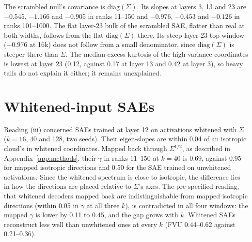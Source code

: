 \documentclass[10pt,twocolumn]{article}
\newcommand{\Sig}{\Sigma}
\begin{document}
The scrambled null's covariance is $\mathrm{diag}(\Sig)$. Its slopes at layers 3, 13 and 23 are $-0.545$, $-1.166$ and $-0.905$ in ranks 11--150 and $-0.976$, $-0.453$ and $-0.126$ in ranks 101--1000. The flat layer-23 bulk of the scrambled SAE, flatter than real at both widths, follows from the flat $\mathrm{diag}(\Sig)$ there. Its steep layer-23 top window ($-0.976$ at 16k) does not follow from a small denominator, since $\mathrm{diag}(\Sig)$ is steeper there than $\Sig$. The median excess kurtosis of the high-variance coordinates is lowest at layer 23 (0.12, against 0.17 at layer 13 and 0.42 at layer 3), so heavy tails do not explain it either; it remains unexplained.

\section{Whitened-input SAEs}
\label{app:whiten}

\begin{table}[!htb]
\centering
\caption{Whitened-input SAEs at layer 12 (width 16,384, mean of two seeds). Left: decoder eigen-slope in whitened coordinates minus that of an isotropic cloud of the same size (all live rows). Middle: $\gamma$ at 8,192 live latents of the decoder mapped back to the original space, of isotropic whitened-space directions mapped the same way, and of the SAE trained on the same tokens without whitening. Right: eval FVU.}
\label{tab:whiten}
\footnotesize
\setlength{\tabcolsep}{2.5pt}

\end{table}

Reading (iii) concerned SAEs trained at layer 12 on activations whitened with $\Sig$ ($k=16$, 40 and 128, two seeds). Their eigen-slopes are within 0.04 of an isotropic cloud's in whitened coordinates. Mapped back through $\Sig^{1/2}$, as described in Appendix~\ref{app:methods}, their $\gamma$ in ranks 11--150 at $k=40$ is 0.69, against 0.95 for mapped isotropic directions and 0.50 for the SAE trained on unwhitened activations. Since the whitened spectrum is close to isotropic, the difference lies in how the directions are placed relative to $\Sig$'s axes. The pre-specified reading, that whitened decoders mapped back are indistinguishable from mapped isotropic directions (within 0.05 in $\gamma$ at all three $k$), is contradicted in all four windows: the mapped $\gamma$ is lower by 0.11 to 0.45, and the gap grows with $k$. Whitened SAEs reconstruct less well than unwhitened ones at every $k$ (FVU 0.44--0.62 against 0.21--0.36).
\end{document}
